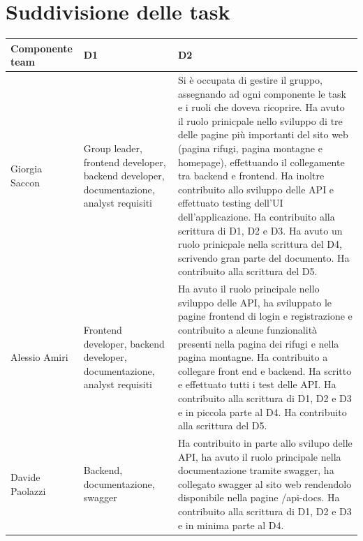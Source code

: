\documentclass[a4paper,12pt]{article}
\begin{document}
\section{Suddivisione delle task}
\begin{center}
\begin{tabular}{| m{7em} | m{10em} | m{20em}|}
\hline
\textbf{Componente team}     &\textbf{D1}       &\textbf{D2}    \\
\hline
Giorgia Saccon        & Group leader, frontend developer, backend developer, documentazione, analyst requisiti  & Si è occupata  di gestire il gruppo, assegnando ad ogni componente le task e i ruoli che doveva ricoprire. \newline Ha avuto il ruolo prinicpale nello sviluppo di tre delle pagine più importanti del sito web (pagina rifugi, pagina montagne e homepage), effettuando il collegamente tra backend e frontend. Ha inoltre contribuito allo sviluppo delle API e effettuato testing dell'UI dell'applicazione. Ha contribuito alla scrittura di D1, D2 e D3. \newline Ha avuto un ruolo prinicpale nella scrittura del D4, scrivendo gran parte del documento.  \newline Ha contribuito alla scrittura del D5. \\
\hline
Alessio Amiri           & Frontend developer, backend developer, documentazione, analyst requisiti  & Ha avuto il ruolo principale nello sviluppo delle API, ha sviluppato le pagine frontend di login e registrazione e contribuito a alcune funzionalità presenti nella pagina dei rifugi e nella pagina montagne.  \newline Ha contribuito a collegare front end e backend. Ha scritto e effettuato tutti i test delle API.  \newline Ha contribuito alla scrittura di D1, D2 e D3 e in piccola parte al D4. \newline Ha contribuito alla scrittura del D5. \\
\hline 
Davide Paolazzi         & Backend, documentazione, swagger  & Ha contribuito in parte allo svilupo delle API, ha avuto il ruolo principale nella documentazione tramite swagger, ha collegato swagger al sito web rendendolo disponibile nella pagine /api-docs.  \newline Ha contribuito alla scrittura di D1, D2 e D3 e in minima parte al D4. \\
\hline 
 
\end{tabular}
\end{center}
\end{document}
